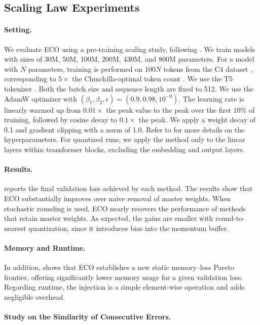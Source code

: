 \documentclass[11pt, a4paper, onecolumn, copyright, goog]{google}
\newcommand{\methodname}{ECO}
\theoremstyle{plain}
\theoremstyle{definition}
\theoremstyle{remark}
\begin{document}
\subsection{Scaling Law Experiments}
\label{sec:exps-scaling}
\paragraph{Setting.}
We evaluate \methodname{} using a pre-training scaling study, following \citet{quest}.
We train models with sizes of 30M, 50M, 100M, 200M, 430M, and 800M parameters.
For a model with $N$ parameters, training is performed on $100N$ tokens from the C4 dataset \citep{t5}, corresponding to $5\times$ the Chinchilla-optimal token count \citep{chinchilla}.
We use the T5 tokenizer \citep{t5,sentencepiece}.
Both the batch size and sequence length are fixed to 512.
We use the AdamW optimizer with $(\beta_1, \beta_2, \epsilon) = (0.9, 0.98, 10^{-9})$.
The learning rate is linearly warmed up from $0.01\times$ the peak value to the peak over the first $10\%$ of training, followed by cosine decay to $0.1\times$ the peak.
We apply a weight decay of 0.1 and gradient clipping with a norm of 1.0.
Refer to \citet{quest} for more details on the hyperparameters.
For quantized runs, we apply the method only to the linear layers within transformer blocks, excluding the embedding and output layers.

\paragraph{Results.}
 reports the final validation loss achieved by each method.
The results show that \methodname{} substantially improves over naive removal of master weights.
When stochastic rounding is used, \methodname{} nearly recovers the performance of methods that retain master weights.
As expected, the gains are smaller with round-to-nearest quantization, since it introduces bias into the momentum buffer.

\paragraph{Memory and Runtime.} In addition,  shows that \methodname{} establishes a new static memory--loss Pareto frontier, offering significantly lower memory usage for a given validation loss. Regarding runtime, the injection is a simple element-wise operation and adds negligible overhead.

\paragraph{Study on the Similarity of 
Consecutive Errors.}
\end{document}
